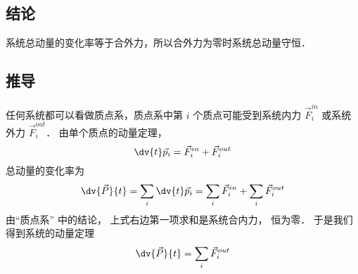 
\subsection{结论}
系统总动量的变化率等于合外力，所以合外力为零时系统总动量守恒．

\subsection{推导}
任何系统都可以看做质点系，质点系中第 $i$ 个质点可能受到系统内力 $\vec F_i^{in}$ 或系统外力 $\vec F_i^{out}$． 由单个质点的动量定理，
\begin{equation}
\dv{t} \vec p_i = \vec F_i^{in} + \vec F_i^{out}
\end{equation}
总动量的变化率为
\begin{equation}
\dv{\vec P}{t} = \sum_i \dv{t} \vec p_i  = \sum_i \vec F_i^{in}  + \sum_i \vec F_i^{out}
\end{equation}
由“质点系” 中的结论， 上式右边第一项求和是系统合内力， 恒为零． 于是我们得到系统的动量定理
\begin{equation}
\dv{\vec P}{t} = \sum_i \vec F_i^{out}
\end{equation}

